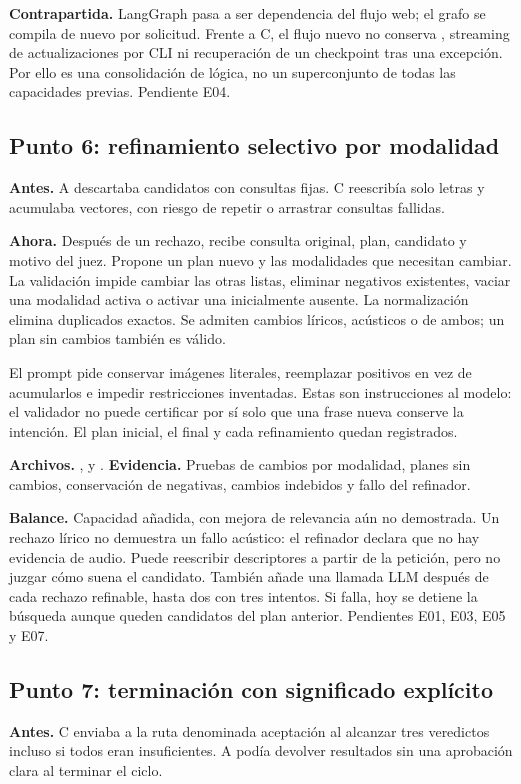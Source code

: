 \textbf{Contrapartida.} LangGraph pasa a ser dependencia del flujo web; el grafo
se compila de nuevo por solicitud. Frente a C, el flujo nuevo no conserva
, streaming de actualizaciones por CLI ni recuperación de un
checkpoint tras una excepción. Por ello es una consolidación de lógica, no un
superconjunto de todas las capacidades previas. Pendiente E04.

\subsection{Punto 6: refinamiento selectivo por modalidad}
\label{cambio:6}
\textbf{Antes.} A descartaba candidatos con consultas fijas. C reescribía solo
letras y acumulaba vectores, con riesgo de repetir o arrastrar consultas fallidas.

\textbf{Ahora.} Después de un rechazo,  recibe consulta original,
plan, candidato y motivo del juez. Propone un plan nuevo y las modalidades que
necesitan cambiar. La validación impide cambiar las otras listas, eliminar
negativos existentes, vaciar una modalidad activa o activar una inicialmente
ausente. La normalización elimina duplicados exactos. Se admiten cambios
líricos, acústicos o de ambos; un plan sin cambios también es válido.

El prompt pide conservar imágenes literales, reemplazar positivos en vez de
acumularlos e impedir restricciones inventadas. Estas son instrucciones al
modelo: el validador no puede certificar por sí solo que una frase nueva conserve
la intención. El plan inicial, el final y cada refinamiento quedan registrados.

\textbf{Archivos.} ,  y .
\textbf{Evidencia.} Pruebas de cambios por modalidad, planes sin cambios,
conservación de negativas, cambios indebidos y fallo del refinador.

\textbf{Balance.} Capacidad añadida, con mejora de relevancia aún no demostrada.
Un rechazo lírico no demuestra un fallo acústico: el refinador declara que no
hay evidencia de audio. Puede reescribir descriptores a partir de la petición,
pero no juzgar cómo suena el candidato. También añade una llamada LLM después
de cada rechazo refinable, hasta dos con tres intentos. Si falla, hoy se detiene
la búsqueda aunque queden candidatos del plan anterior. Pendientes E01, E03,
E05 y E07.

\subsection{Punto 7: terminación con significado explícito}
\label{cambio:7}
\textbf{Antes.} C enviaba a la ruta denominada aceptación al alcanzar tres
veredictos incluso si todos eran insuficientes. A podía devolver resultados
sin una aprobación clara al terminar el ciclo.

